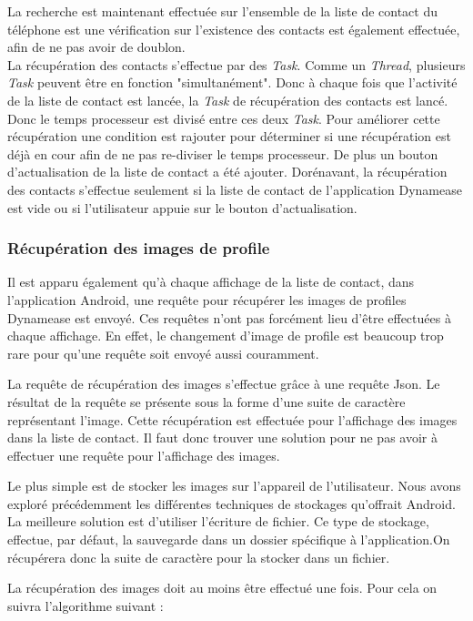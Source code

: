 La recherche est maintenant effectuée sur l'ensemble de la liste de contact du téléphone est une vérification sur l'existence des contacts est également effectuée, afin de ne pas avoir de doublon.\\ 

La récupération des contacts s'effectue par des \textit{Task}. Comme un \textit{Thread}, plusieurs \textit{Task} peuvent être en fonction "simultanément". Donc à chaque fois que l'activité de la liste de contact est lancée, la \textit{Task} de récupération des contacts est lancé. Donc le temps processeur est divisé entre ces deux \textit{Task}. Pour améliorer cette récupération une condition est rajouter pour déterminer si une récupération est déjà en cour afin de ne pas re-diviser le temps processeur. De plus un bouton d'actualisation de la liste de contact a été ajouter. Dorénavant, la récupération des contacts s'effectue seulement si la liste de contact de l'application Dynamease est vide ou si l'utilisateur appuie sur le bouton d'actualisation.

\subsubsection{Récupération des images de profile}

Il est apparu également qu'à chaque affichage de la liste de contact, dans l'application Android, une requête pour récupérer les images de profiles Dynamease est envoyé. Ces requêtes n'ont pas forcément lieu d'être effectuées à chaque affichage. En effet, le changement d'image de profile est beaucoup trop rare pour qu'une requête soit envoyé aussi couramment.

La requête de récupération des images s'effectue grâce à une requête Json. Le résultat de la requête se présente sous la forme d'une suite de caractère représentant l'image. Cette récupération est effectuée pour l'affichage des images dans la liste de contact. Il faut donc trouver une solution pour ne pas avoir à effectuer une requête pour l'affichage des images.

Le plus simple est de stocker les images sur l'appareil de l'utilisateur. Nous avons exploré précédemment les différentes techniques de stockages qu'offrait Android. La meilleure solution est d'utiliser l'écriture de fichier. Ce type de stockage, effectue, par défaut, la sauvegarde dans un dossier spécifique à l'application.On récupérera donc la suite de caractère pour la stocker dans un fichier. 

La récupération des images doit au moins être effectué une fois. Pour cela on suivra l'algorithme suivant :

